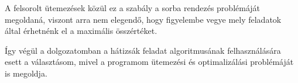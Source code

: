 A felsorolt ütemezések közül ez a szabály a sorba rendezés problémáját megoldaná, viszont arra nem elegendő, hogy figyelembe vegye mely feladatok által érhetnénk el a maximális összértéket.

Így végül a dolgozatomban a hátizsák feladat algoritmusának felhasználására esett a választásom, mivel a programom ütemezési és optimalizálási problémáját is megoldja.
